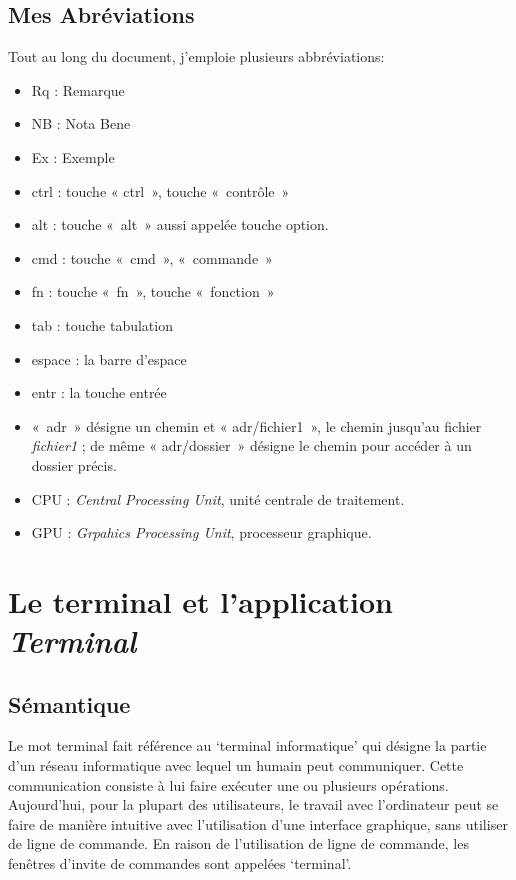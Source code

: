 \section{Mes Abréviations}\label{mes-abruxe9viations}

Tout au long du document, j'emploie plusieurs abbréviations:

\begin{itemize}
\item
  Rq : Remarque
\item
  NB : Nota Bene
\item
  Ex : Exemple
\item
  ctrl : touche « ctrl~», touche «~contrôle~»
\item
  alt : touche «~alt~» aussi appelée touche option.
\item
  cmd : touche «~cmd~», «~commande~»
\item
  fn : touche «~fn~», touche «~fonction~»
\item
  tab : touche tabulation ~
\item
  espace : la barre d'espace
\item
  entr : la touche entrée
\item
  «~adr~» désigne un chemin et « adr/fichier1~», le chemin jusqu'au
  fichier \emph{fichier1} ; de même « adr/dossier~» désigne le chemin
  pour accéder à un dossier précis.
\item
  CPU : \emph{Central Processing Unit}, unité centrale de traitement.
\item
  GPU : \emph{Grpahics Processing Unit}, processeur graphique.
\end{itemize}

\chapter{\texorpdfstring{Le terminal et l'application
\emph{Terminal}}{Le terminal et l'application Terminal}}\label{le-terminal-et-lapplication-terminal}

\section{Sémantique}\label{suxe9mantique}

Le mot terminal fait référence au `terminal informatique' qui désigne la
partie d'un réseau informatique avec lequel un humain peut communiquer.
Cette communication consiste à lui faire exécuter une ou plusieurs
opérations. Aujourd'hui, pour la plupart des utilisateurs, le travail
avec l'ordinateur peut se faire de manière intuitive avec l'utilisation
d'une interface graphique, sans utiliser de ligne de commande. En raison
de l'utilisation de ligne de commande, les fenêtres d'invite de
commandes sont appelées `terminal'.

